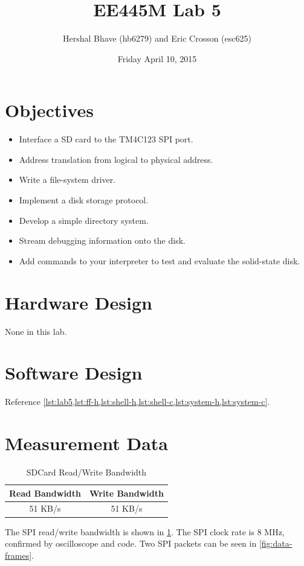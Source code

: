 \documentclass[12pt]{article}
\title{EE445M Lab 5}
\author{Hershal Bhave (hb6279) and Eric Crosson (esc625)}
\date{Friday April 10, 2015}
\begin{document}
\maketitle

\section{Objectives}
\begin{itemize}

\item Interface a SD card to the TM4C123 SPI port.
\item Address translation from logical to physical address.
\item Write a file-system driver.
\item Implement a disk storage protocol.
\item Develop a simple directory system.
\item Stream debugging information onto the disk.
\item Add commands to your interpreter to test and evaluate the
  solid-state disk.
\end{itemize}

\section{Hardware Design}
None in this lab.

\section{Software Design}
Reference \cref{lst:lab5,lst:ff-h,lst:shell-h,lst:shell-c,lst:system-h,lst:system-c}.

\section{Measurement Data}
\begin{table}
  \centering
  \begin{tabular}{c|c}
    Read Bandwidth & Write Bandwidth \\
    \hline
    51 KB/s & 51 KB/s \\
  \end{tabular}
  \caption{SDCard Read/Write Bandwidth}
  \label{tbl:sdcard-bandwidth}
\end{table}

The SPI read/write bandwidth is shown in
\cref{tbl:sdcard-bandwidth}. The SPI clock rate is 8 MHz, confirmed by
oscilloscope and code. Two SPI packets can be seen in
\cref{fig:data-frames}.
\end{document}
